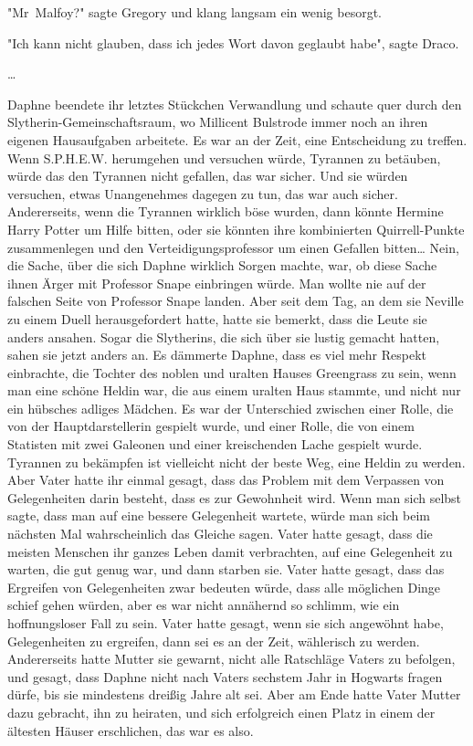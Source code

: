 {"Mr~Malfoy?" sagte Gregory und klang langsam ein wenig besorgt.

"Ich kann nicht glauben, dass ich jedes Wort davon geglaubt habe", sagte Draco.

…

Daphne beendete ihr letztes Stückchen Verwandlung und schaute quer durch den Slytherin-Gemeinschaftsraum, wo Millicent Bulstrode immer noch an ihren eigenen Hausaufgaben arbeitete. Es war an der Zeit, eine Entscheidung zu treffen. Wenn S.P.H.E.W. herumgehen und versuchen würde, Tyrannen zu betäuben, würde das den Tyrannen nicht gefallen, das war sicher. Und sie würden versuchen, etwas Unangenehmes dagegen zu tun, das war auch sicher. Andererseits, wenn die Tyrannen wirklich böse wurden, dann könnte Hermine Harry Potter um Hilfe bitten, oder sie könnten ihre kombinierten Quirrell-Punkte zusammenlegen und den Verteidigungsprofessor um einen Gefallen bitten… Nein, die Sache, über die sich Daphne wirklich Sorgen machte, war, ob diese Sache ihnen Ärger mit Professor Snape einbringen würde. Man wollte nie auf der falschen Seite von Professor Snape landen. Aber seit dem Tag, an dem sie Neville zu einem Duell herausgefordert hatte, hatte sie bemerkt, dass die Leute sie anders ansahen. Sogar die Slytherins, die sich über sie lustig gemacht hatten, sahen sie jetzt anders an. Es dämmerte Daphne, dass es viel mehr Respekt einbrachte, die Tochter des noblen und uralten Hauses Greengrass zu sein, wenn man eine schöne Heldin war, die aus einem uralten Haus stammte, und nicht nur ein hübsches adliges Mädchen. Es war der Unterschied zwischen einer Rolle, die von der Hauptdarstellerin gespielt wurde, und einer Rolle, die von einem Statisten mit zwei Galeonen und einer kreischenden Lache gespielt wurde. Tyrannen zu bekämpfen ist vielleicht nicht der beste Weg, eine Heldin zu werden. Aber Vater hatte ihr einmal gesagt, dass das Problem mit dem Verpassen von Gelegenheiten darin besteht, dass es zur Gewohnheit wird. Wenn man sich selbst sagte, dass man auf eine bessere Gelegenheit wartete, würde man sich beim nächsten Mal wahrscheinlich das Gleiche sagen. Vater hatte gesagt, dass die meisten Menschen ihr ganzes Leben damit verbrachten, auf eine Gelegenheit zu warten, die gut genug war, und dann starben sie. Vater hatte gesagt, dass das Ergreifen von Gelegenheiten zwar bedeuten würde, dass alle möglichen Dinge schief gehen würden, aber es war nicht annähernd so schlimm, wie ein hoffnungsloser Fall zu sein. Vater hatte gesagt, wenn sie sich angewöhnt habe, Gelegenheiten zu ergreifen, dann sei es an der Zeit, wählerisch zu werden. Andererseits hatte Mutter sie gewarnt, nicht alle Ratschläge Vaters zu befolgen, und gesagt, dass Daphne nicht nach Vaters sechstem Jahr in Hogwarts fragen dürfe, bis sie mindestens dreißig Jahre alt sei. Aber am Ende hatte Vater Mutter dazu gebracht, ihn zu heiraten, und sich erfolgreich einen Platz in einem der ältesten Häuser erschlichen, das war es also.

}
